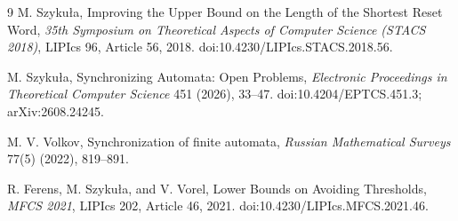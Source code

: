 \documentclass[11pt]{article}
\theoremstyle{definition}
\theoremstyle{remark}
\begin{document}
\begin{thebibliography}{9}
M. Szyku\l a,
\newblock Improving the Upper Bound on the Length of the Shortest Reset Word,
\newblock \emph{35th Symposium on Theoretical Aspects of Computer Science (STACS 2018)}, LIPIcs 96, Article 56, 2018.
\newblock doi:10.4230/LIPIcs.STACS.2018.56.

M. Szyku\l a,
\newblock Synchronizing Automata: Open Problems,
\newblock \emph{Electronic Proceedings in Theoretical Computer Science} 451 (2026), 33--47.
\newblock doi:10.4204/EPTCS.451.3; arXiv:2608.24245.

M. V. Volkov,
\newblock Synchronization of finite automata,
\newblock \emph{Russian Mathematical Surveys} 77(5) (2022), 819--891.

R. Ferens, M. Szyku\l a, and V. Vorel,
\newblock Lower Bounds on Avoiding Thresholds,
\newblock \emph{MFCS 2021}, LIPIcs 202, Article 46, 2021.
\newblock doi:10.4230/LIPIcs.MFCS.2021.46.
\end{thebibliography}
\end{document}
